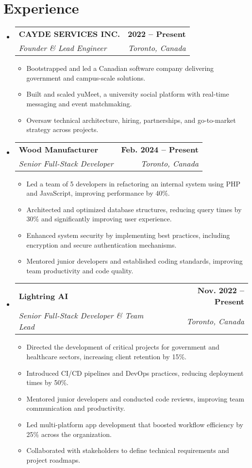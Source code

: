 \documentclass[letterpaper,11pt]{article}
\makeatletter
\newcommand{\resumeItem}[1]{
  \item\small{
    {#1 \vspace{-2pt}}
  }
}
\newcommand{\resumeSubheading}[4]{
  \vspace{-2pt}\item
    \begin{tabular*}{1.0\textwidth}[t]{l@{\extracolsep{\fill}}r}
      \textbf{#1} & \textbf{\small #2} \\
      \textit{\small#3} & \textit{\small #4} \\
    \end{tabular*}\vspace{-7pt}
}
\newcommand{\resumeSubHeadingListStart}{\begin{itemize}[leftmargin=0.0in, label={}]}
\newcommand{\resumeSubHeadingListEnd}{\end{itemize}}
\newcommand{\resumeItemListStart}{\begin{itemize}}
\newcommand{\resumeItemListEnd}{\end{itemize}\vspace{-5pt}}
\makeatother
\begin{document}
\section{Experience}
  \resumeSubHeadingListStart
    \resumeSubheading
      {CAYDE SERVICES INC.}{2022 -- Present}
      {Founder \& Lead Engineer}{Toronto, Canada}
      \resumeItemListStart
        \resumeItem{Bootstrapped and led a Canadian software company delivering government and campus-scale solutions.}
        \resumeItem{Built and scaled yuMeet, a university social platform with real-time messaging and event matchmaking.}
        \resumeItem{Oversaw technical architecture, hiring, partnerships, and go-to-market strategy across projects.}
      \resumeItemListEnd

    \resumeSubheading
      {Wood Manufacturer}{Feb. 2024 -- Present}
      {Senior Full-Stack Developer}{Toronto, Canada}
      \resumeItemListStart
        \resumeItem{Led a team of 5 developers in refactoring an internal system using PHP and JavaScript, improving performance by 40\%.}
        \resumeItem{Architected and optimized database structures, reducing query times by 30\% and significantly improving user experience.}
        \resumeItem{Enhanced system security by implementing best practices, including encryption and secure authentication mechanisms.}
        \resumeItem{Mentored junior developers and established coding standards, improving team productivity and code quality.}
      \resumeItemListEnd

    \resumeSubheading
      {Lightring AI}{Nov. 2022 -- Present}
      {Senior Full-Stack Developer \& Team Lead}{Toronto, Canada}
      \resumeItemListStart
        \resumeItem{Directed the development of critical projects for government and healthcare sectors, increasing client retention by 15\%.}
        \resumeItem{Introduced CI/CD pipelines and DevOps practices, reducing deployment times by 50\%.}
        \resumeItem{Mentored junior developers and conducted code reviews, improving team communication and productivity.}
        \resumeItem{Led multi-platform app development that boosted workflow efficiency by 25\% across the organization.}
        \resumeItem{Collaborated with stakeholders to define technical requirements and project roadmaps.}
      \resumeItemListEnd

  \resumeSubHeadingListEnd
\vspace{-16pt}

\end{document}

